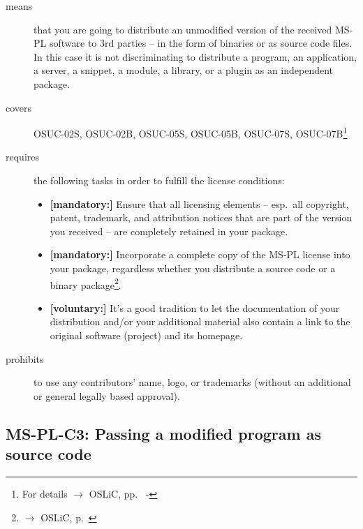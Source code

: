 \begin{description}
\item[means] that you are going to distribute an unmodified version of the
received MS-PL software to 3rd parties -- in the form of binaries or as source
code files. In this case it is not discriminating to distribute a
program, an application, a server, a snippet, a module, a library, or a plugin
as an independent package.

\item[covers] OSUC-02S, OSUC-02B, OSUC-05S,  OSUC-05B, OSUC-07S,
OSUC-07B\footnote{For details $\rightarrow$ OSLiC, pp.\ \pageref{OSUC-02B-DEF} -
\pageref{OSUC-07B-DEF}}

\item[requires] the following tasks in order to fulfill the license conditions:
\begin{itemize}
  \item \textbf{[mandatory:]} Ensure that all licensing elements -- esp.\ all
  copyright, patent, trademark, and attribution notices that are part of the
  version you received -- are completely retained in your package.
  
  \item \textbf{[mandatory:]} Incorporate a complete copy of the MS-PL license
  into your package, regardless whether you distribute a source code or a binary
  package\footnote{$\rightarrow$ OSLiC, p.\ \pageref{MsplSourceBinHint}}.
  
  \item \textbf{[voluntary:]} It's a good tradition to let the documentation of
  your distribution and/or your additional material also contain a link to the
  original software (project) and its homepage.
\end{itemize}

\item[prohibits] to use any contributors' name, logo, or trademarks (without an
additional or general legally based approval).

\end{description}

\subsection{MS-PL-C3: Passing a modified program as source code}
\label{OSUC-04S-MS-PL}

